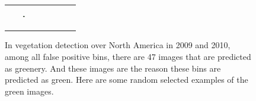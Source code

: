 \begin{figure}[th]
{{\begin{center}
\begin{tabular}{@{}c@{\,\,\,}c@{\,\,\,}c@{\,\,\,}c@{\,\,\,}c@{\,\,\,}}
\includegraphics[width=0.06\textwidth, height=0.35in]{imggrid/falseposi/20.jpg} \\
\end{tabular}
\end{center}
}}
\vspace{-6pt}
\caption{In vegetation detection over North America in 2009 and 2010, among all false positive bins, there are 47 images that are predicted as greenery. And these images are the reason these bins are predicted as green. Here are some random selected examples of the green images.}
\label{fig:falseposi}
\vspace{-6pt}
\end{figure}

